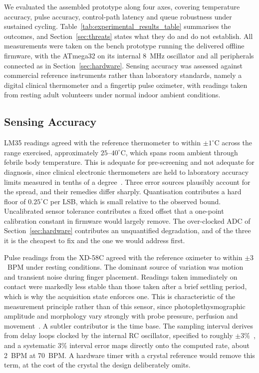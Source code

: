 

We evaluated the assembled prototype along four axes, covering temperature accuracy, pulse
accuracy, control-path latency and queue robustness under sustained cycling.
Table~\ref{tab:experimental_results_table} summarises the outcomes, and
Section~\ref{sec:threats} states what they do and do not establish. All measurements were taken on
the bench prototype running the delivered offline firmware, with the ATmega32 on its internal
8~MHz oscillator and all peripherals connected as in Section~\ref{sec:hardware}. Sensing accuracy
was assessed against commercial reference instruments rather than laboratory standards, namely a
digital clinical thermometer and a fingertip pulse oximeter, with readings taken from resting
adult volunteers under normal indoor ambient conditions.

\subsection{Sensing Accuracy}
LM35 readings agreed with the reference thermometer to within $\pm 1^{\circ}$C across the range
exercised, approximately $25$--$40^{\circ}$C, which spans room ambient through febrile body
temperature. This is adequate for pre-screening and not adequate for diagnosis, since clinical
electronic thermometers are held to laboratory accuracy limits measured in tenths of a
degree~\cite{iso80601}. Three error sources plausibly account for the spread, and their remedies
differ sharply. Quantisation contributes a hard floor of $0.25^{\circ}$C per LSB, which is small
relative to the observed bound. Uncalibrated sensor tolerance contributes a fixed offset that a
one-point calibration constant in firmware would largely remove. The over-clocked ADC of
Section~\ref{sec:hardware} contributes an unquantified degradation, and of the three it is the
cheapest to fix and the one we would address first.

Pulse readings from the XD-58C agreed with the reference oximeter to within $\pm 3$~BPM under resting
conditions. The dominant source of variation was motion and transient noise during finger placement.
Readings taken immediately on contact were markedly less stable than those taken after a brief
settling period, which is why the acquisition state enforces one. This is characteristic of the
measurement principle rather than of this sensor, since photoplethysmographic amplitude and
morphology vary strongly with probe pressure, perfusion and movement~\cite{allen2007ppg}. A subtler
contributor is the time base. The sampling interval derives from delay loops clocked by the internal
RC oscillator, specified to roughly $\pm 3\%$~\cite{microchip2020}, and a systematic 3\% interval
error maps directly onto the computed rate, about 2~BPM at 70~BPM. A hardware timer with a crystal
reference would remove this term, at the cost of the crystal the design deliberately omits.

